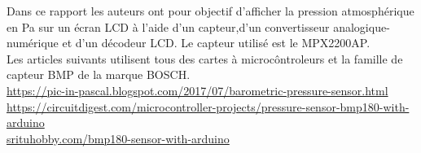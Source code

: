 \documentclass[a4paper,12pt]{report}
\begin{document}


\pagebreak

\pagestyle{empty}

Dans ce rapport \cite{barometer} les auteurs ont pour objectif d'afficher la pression atmosphérique en Pa sur un écran LCD à l'aide d'un capteur,d'un convertisseur analogique-numérique et d'un décodeur LCD. Le capteur utilisé est le MPX2200AP.\\

Les articles suivants utilisent tous des cartes à microcôntroleurs et la famille de capteur BMP de la marque BOSCH.\\

\url{https://pic-in-pascal.blogspot.com/2017/07/barometric-pressure-sensor.html}\\[1cm]
\url{https://circuitdigest.com/microcontroller-projects/pressure-sensor-bmp180-with-arduino}\\[1cm]
\url{srituhobby.com/bmp180-sensor-with-arduino}\\[1cm]



 
\end{document}
